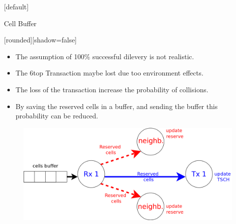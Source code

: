 \documentclass{beamer}
\makeatletter
\newenvironment{withoutheadline}{
        \setbeamertemplate{headline}[default]
        \def\beamer@entrycode{\vspace*{-\headheight}}
    }{}
\makeatother
\begin{document}
\begin{withoutheadline}
\begin{frame}{Cell Buffer}


[rounded][shadow=false]


\begin{block}

    \begin{itemize}
    \item The assumption of 100\% successful dilevery is not realistic.
    \item<2-> The 6top Transaction maybe lost due too environment effects. 
    \item<3-> The loss of the transaction increase the probability of collisions. 
    \item<4-> By saving the reserved cells in a buffer, and sending the buffer this probability can be reduced.
     
    
    \end{itemize}
    \end{block}

\centering
\begin{figure}[p]

\includegraphics[width=0.7\linewidth]{reserve2.png}
\end{figure}

\end{frame}
\end{withoutheadline}
\end{document}
